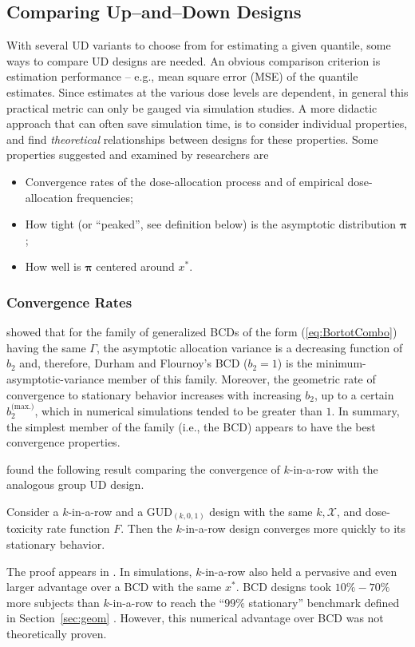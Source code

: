 \subsection{Comparing Up--and--Down Designs}

With several UD variants to choose from for estimating a given quantile, some ways to compare UD designs are needed. An obvious comparison criterion is estimation performance -- e.g., mean square error (MSE) of the quantile estimates. Since estimates at the various dose levels are dependent, in general this practical metric can only be gauged via simulation studies. A more didactic approach that can often save simulation time, is to consider individual properties, and find \emph{theoretical} relationships between designs for these properties. Some properties suggested and examined by researchers are
%
\begin{itemize}
\item Convergence rates of the dose-allocation process and of empirical dose-allocation frequencies;
\item How tight (or ``peaked'', see definition below) is the asymptotic distribution $\boldsymbol{\pi}$;
\item How well is $\boldsymbol{\pi}$ centered around $x^*$.
\end{itemize}

\subsubsection{Convergence Rates}

\cite{Bort:Giov:Upan:2005} showed that for the family of generalized BCDs of the form (\ref{eq:BortotCombo}) having the same $\Gamma$, the asymptotic allocation variance is a decreasing function of $b_2$ and, therefore, Durham and Flournoy's BCD ($b_2=1$) is the minimum-asymptotic-variance member of this family. Moreover, the geometric rate of convergence to stationary behavior increases with increasing $b_2$, up to a certain $b_2^\textrm{(max.)}$, which in numerical simulations tended to be greater than $1$. In summary, the simplest member of the family (i.e., the BCD) appears to have the best convergence properties.

\cite{Oron:Hoff:thek:2009} found the following result comparing the convergence of $k$-in-a-row with the analogous group UD design.
%
\begin{thm}\label{thm:krgudconv} Consider a $k$-in-a-row and a GUD$_{(k,0,1)}$ design with the same $k,\mathcal{X}$, and dose-toxicity rate function $F$. Then the $k$-in-a-row design converges more quickly to its stationary behavior.\end{thm}
%
\noindent The proof appears in \cite{Oron:Hoff:thek:2009}. In simulations, $k$-in-a-row also held a pervasive and even larger advantage over a BCD with the same $x^*$. BCD designs took $10\%-70\%$ more subjects than $k$-in-a-row to reach the ``$99\%$ stationary'' benchmark defined in Section~\ref{sec:geom} \citep{Oron:Hoff:thek:2009}. However, this numerical advantage over BCD was not theoretically proven.

